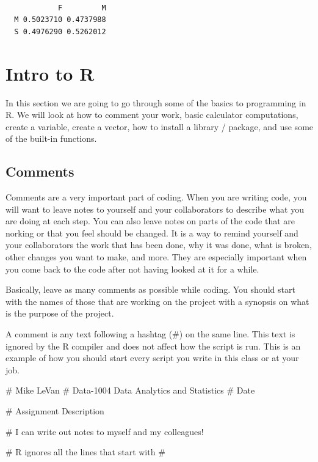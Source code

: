 \documentclass[
  letterpaper,
  DIV=11,
  numbers=noendperiod]{scrreprt}
\newenvironment{Shaded}{\begin{snugshade}}{\end{snugshade}}
\newcommand{\CommentTok}[1]{\textcolor[rgb]{0.37,0.37,0.37}{#1}}
\begin{document}
\begin{verbatim}
   
            F         M
  M 0.5023710 0.4737988
  S 0.4976290 0.5262012
\end{verbatim}


\chapter*{Intro to R}\label{intro-to-r}


In this section we are going to go through some of the basics to
programming in R. We will look at how to comment your work, basic
calculator computations, create a variable, create a vector, how to
install a library / package, and use some of the built-in functions.

\section*{Comments}\label{comments}


Comments are a very important part of coding. When you are writing code,
you will want to leave notes to yourself and your collaborators to
describe what you are doing at each step. You can also leave notes on
parts of the code that are norking or that you feel should be changed.
It is a way to remind yourself and your collaborators the work that has
been done, why it was done, what is broken, other changes you want to
make, and more. They are especially important when you come back to the
code after not having looked at it for a while.

Basically, leave as many comments as possible while coding. You should
start with the names of those that are working on the project with a
synopsis on what is the purpose of the project.

A comment is any text following a hashtag (\#) on the same line. This
text is ignored by the R compiler and does not affect how the script is
run. This is an example of how you should start every script you write
in this class or at your job.

\begin{Shaded}
\begin{Highlighting}[]
\CommentTok{\# Mike LeVan}
\CommentTok{\# Data{-}1004 Data Analytics and Statistics}
\CommentTok{\# Date}

\CommentTok{\# Assignment Description}

\CommentTok{\# I can write out notes to myself and my colleagues!}

\CommentTok{\# R ignores all the lines that start with \#}
\end{Highlighting}
\end{Shaded}
\end{document}
